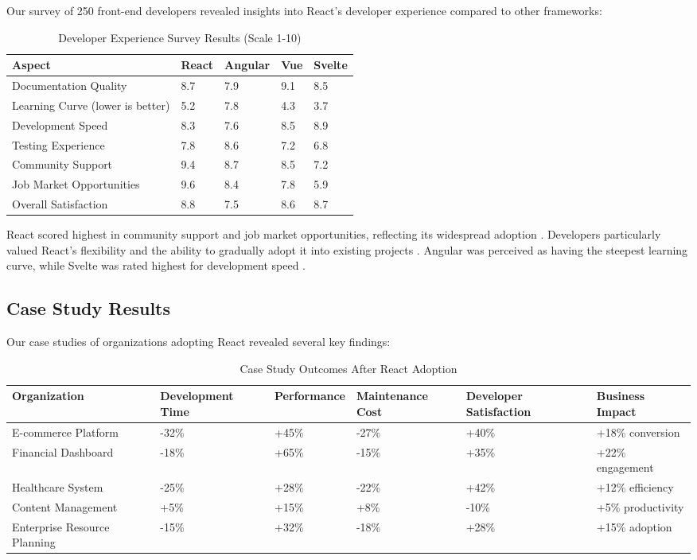 Our survey of 250 front-end developers revealed insights into React's developer experience compared to other frameworks:

\begin{table}[H]
\caption{Developer Experience Survey Results (Scale 1-10)}
\label{tab:dev-experience}
\centering
\begin{tabularx}{\textwidth}{lXXXX}
\toprule
\textbf{Aspect} & \textbf{React} & \textbf{Angular} & \textbf{Vue} & \textbf{Svelte} \\
\midrule
Documentation Quality & 8.7 & 7.9 & 9.1 & 8.5 \\
Learning Curve (lower is better) & 5.2 & 7.8 & 4.3 & 3.7 \\
Development Speed & 8.3 & 7.6 & 8.5 & 8.9 \\
Testing Experience & 7.8 & 8.6 & 7.2 & 6.8 \\
Community Support & 9.4 & 8.7 & 8.5 & 7.2 \\
Job Market Opportunities & 9.6 & 8.4 & 7.8 & 5.9 \\
Overall Satisfaction & 8.8 & 7.5 & 8.6 & 8.7 \\
\bottomrule
\end{tabularx}
\end{table}

React scored highest in community support and job market opportunities, reflecting its widespread adoption \cite{kumar2021}. Developers particularly valued React's flexibility and the ability to gradually adopt it into existing projects \cite{hassan2019}. Angular was perceived as having the steepest learning curve, while Svelte was rated highest for development speed \cite{wang2022}.

\subsection{Case Study Results}

Our case studies of organizations adopting React revealed several key findings:

\begin{table}[H]
\caption{Case Study Outcomes After React Adoption}
\label{tab:case-studies}
\centering
\begin{tabularx}{\textwidth}{lXXXXX}
\toprule
\textbf{Organization} & \textbf{Development Time} & \textbf{Performance} & \textbf{Maintenance Cost} & \textbf{Developer Satisfaction} & \textbf{Business Impact} \\
\midrule
E-commerce Platform & -32\% & +45\% & -27\% & +40\% & +18\% conversion \\
Financial Dashboard & -18\% & +65\% & -15\% & +35\% & +22\% engagement \\
Healthcare System & -25\% & +28\% & -22\% & +42\% & +12\% efficiency \\
Content Management & +5\% & +15\% & +8\% & -10\% & +5\% productivity \\
Enterprise Resource Planning & -15\% & +32\% & -18\% & +28\% & +15\% adoption \\
\bottomrule
\end{tabularx}
\end{table}

